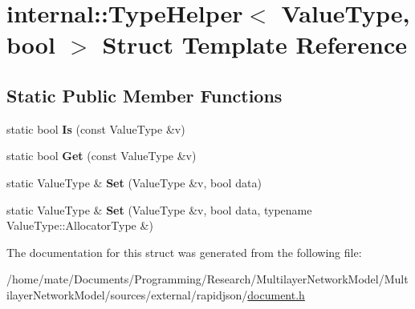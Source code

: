 \hypertarget{structinternal_1_1TypeHelper_3_01ValueType_00_01bool_01_4}{}\section{internal\+:\+:Type\+Helper$<$ Value\+Type, bool $>$ Struct Template Reference}
\label{structinternal_1_1TypeHelper_3_01ValueType_00_01bool_01_4}
\subsection*{Static Public Member Functions}
\begin{DoxyCompactItemize}
\item 
static bool {\bfseries Is} (const Value\+Type \&v)\hypertarget{structinternal_1_1TypeHelper_3_01ValueType_00_01bool_01_4_aa73fb8b4ed649706f7f9165401f89c27}{}\label{structinternal_1_1TypeHelper_3_01ValueType_00_01bool_01_4_aa73fb8b4ed649706f7f9165401f89c27}

\item 
static bool {\bfseries Get} (const Value\+Type \&v)\hypertarget{structinternal_1_1TypeHelper_3_01ValueType_00_01bool_01_4_aed612b233e5985d049248b414fb0034a}{}\label{structinternal_1_1TypeHelper_3_01ValueType_00_01bool_01_4_aed612b233e5985d049248b414fb0034a}

\item 
static Value\+Type \& {\bfseries Set} (Value\+Type \&v, bool data)\hypertarget{structinternal_1_1TypeHelper_3_01ValueType_00_01bool_01_4_a4bfa644e57e7d725468ed78103c1579a}{}\label{structinternal_1_1TypeHelper_3_01ValueType_00_01bool_01_4_a4bfa644e57e7d725468ed78103c1579a}

\item 
static Value\+Type \& {\bfseries Set} (Value\+Type \&v, bool data, typename Value\+Type\+::\+Allocator\+Type \&)\hypertarget{structinternal_1_1TypeHelper_3_01ValueType_00_01bool_01_4_a01a2bdf4117fb767c8d703be9e0f5f1d}{}\label{structinternal_1_1TypeHelper_3_01ValueType_00_01bool_01_4_a01a2bdf4117fb767c8d703be9e0f5f1d}

\end{DoxyCompactItemize}


The documentation for this struct was generated from the following file\+:\begin{DoxyCompactItemize}
\item 
/home/mate/\+Documents/\+Programming/\+Research/\+Multilayer\+Network\+Model/\+Multilayer\+Network\+Model/sources/external/rapidjson/\hyperlink{document_8h}{document.\+h}\end{DoxyCompactItemize}
